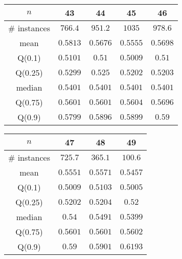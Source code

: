 \begin{tabular}{c|cccc} 
\hline 
$n$ & 43 & 44 & 45 & 46 \tabularnewline 
\hline 
\hline 
\# instances & $766.4$ & $951.2$ & $1035$ & $978.6$ \tabularnewline 
mean & $0.5813$ & $0.5676$ & $0.5555$ & $0.5698$ \tabularnewline 
Q(0.1) & $0.5101$ & $0.51$ & $0.5009$ & $0.51$ \tabularnewline 
Q(0.25) & $0.5299$ & $0.525$ & $0.5202$ & $0.5203$ \tabularnewline 
median & $0.5401$ & $0.5401$ & $0.5401$ & $0.5401$ \tabularnewline 
Q(0.75) & $0.5601$ & $0.5601$ & $0.5604$ & $0.5696$ \tabularnewline 
Q(0.9) & $0.5799$ & $0.5896$ & $0.5899$ & $0.59$ \tabularnewline 
\hline 
\end{tabular} 
\medskip{} 

\begin{tabular}{c|ccc} 
\hline 
$n$ & 47 & 48 & 49 \tabularnewline 
\hline 
\hline 
\# instances & $725.7$ & $365.1$ & $100.6$ \tabularnewline 
mean & $0.5551$ & $0.5571$ & $0.5457$ \tabularnewline 
Q(0.1) & $0.5009$ & $0.5103$ & $0.5005$ \tabularnewline 
Q(0.25) & $0.5202$ & $0.5204$ & $0.52$ \tabularnewline 
median & $0.54$ & $0.5491$ & $0.5399$ \tabularnewline 
Q(0.75) & $0.5601$ & $0.5601$ & $0.5602$ \tabularnewline 
Q(0.9) & $0.59$ & $0.5901$ & $0.6193$ \tabularnewline 
\hline 
\end{tabular} 
\medskip{} 

